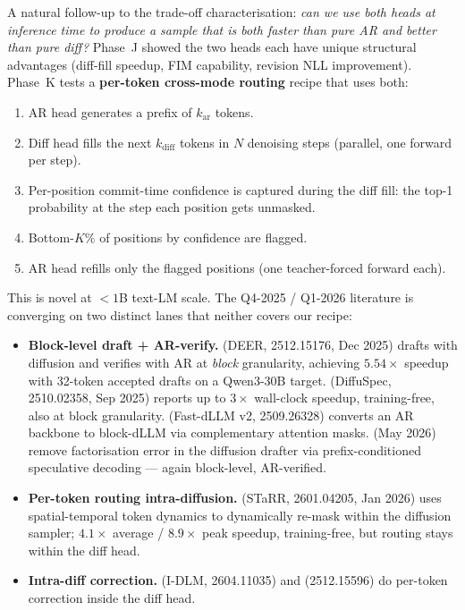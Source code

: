 \label{sec:phase-k}

A natural follow-up to the trade-off characterisation: \emph{can we
use both heads at inference time to produce a sample that is both
faster than pure AR and better than pure diff?} Phase~J showed the
two heads each have unique structural advantages (diff-fill speedup,
FIM capability, revision NLL improvement). Phase~K tests a
\textbf{per-token cross-mode routing} recipe that uses both:

\begin{enumerate}
  \setlength\itemsep{0pt}
  \item AR head generates a prefix of $k_\text{ar}$ tokens.
  \item Diff head fills the next $k_\text{diff}$ tokens in $N$
        denoising steps (parallel, one forward per step).
  \item Per-position commit-time confidence is captured during the
        diff fill: the top-1 probability at the step each position
        gets unmasked.
  \item Bottom-$K\%$ of positions by confidence are flagged.
  \item AR head refills only the flagged positions
        (one teacher-forced forward each).
\end{enumerate}

This is novel at $<\!1$B text-LM scale. The Q4-2025 / Q1-2026 literature
is converging on two distinct lanes that neither covers our recipe:

\begin{itemize}
  \setlength\itemsep{2pt}
  \item \textbf{Block-level draft + AR-verify.} \citet{spasov2025deer}
        (DEER, 2512.15176, Dec 2025) drafts with diffusion and verifies
        with AR at \emph{block} granularity, achieving $5.54\times$
        speedup with 32-token accepted drafts on a Qwen3-30B target.
        \citet{diffuspec2025} (DiffuSpec, 2510.02358, Sep 2025) reports
        up to $3\times$ wall-clock speedup, training-free, also at
        block granularity. \citet{wu2025fastdllmv2} (Fast-dLLM v2,
        2509.26328) converts an AR backbone to block-dLLM via
        complementary attention masks. \citet{fang2026feffree}
        (May 2026) remove factorisation error in the diffusion drafter
        via prefix-conditioned speculative decoding --- again
        block-level, AR-verified.
  \item \textbf{Per-token routing intra-diffusion.} \citet{starr2026}
        (STaRR, 2601.04205, Jan 2026) uses spatial-temporal token
        dynamics to dynamically re-mask within the diffusion sampler;
        $4.1\times$ average / $8.9\times$ peak speedup, training-free,
        but routing stays within the diff head.
  \item \textbf{Intra-diff correction.} \citet{im2025idlm} (I-DLM,
        2604.11035) and \citet{corrective_dlm_2025} (2512.15596) do
        per-token correction inside the diff head.
\end{itemize}

